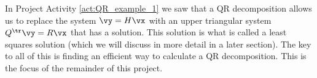 \begin{pactivity}
\begin{comment}
\solution Letting $\vx = \left[ \begin{array}{c} x_1 \\ x_2\end{array} \right]$, we have 
\[Q^{\tr} \vy =  \left[ \renewcommand{\arraystretch}{1.4} \begin{array}{rrc} 2/3&2/3&1/3\\ -\frac{\sqrt{2}}{6} &-\frac{\sqrt{2}}{6}& \frac{2\sqrt{2}}{3}\end {array} \right]   \left[ \begin{array}{c} 2 \\ 1 \\ 4\end{array} \right] =  \left[ \renewcommand{\arraystretch}{1.4} \begin{array}{c} \frac{10}{3} \\ \frac{13 \sqrt{2}}{6} \end{array} \right]\]
and
\[R \vx = \left[ \renewcommand{\arraystretch}{1.4}\begin{array}{cc} 3&3\\0&3\sqrt{2} \end{array} \right]\left[ \begin{array}{c} x_1\\x_2 \end{array} \right] = \left[\renewcommand{\arraystretch}{1.4} \begin{array}{c} 3x_1+3x_2 \\ 3\sqrt{2}x_2 \end{array} \right].\]
We are then reduced to the triangular system 
\[\left[ \renewcommand{\arraystretch}{1.4} \begin{array}{c} \frac{10}{3} \\ \frac{13 \sqrt{2}}{6} \end{array} \right] = \left[\renewcommand{\arraystretch}{1.4} \begin{array}{c} 3x_1+3x_2 \\ 3\sqrt{2}x_2 \end{array} \right].\]
This makes $x_2 = \frac{1}{\sqrt{2}}{3}\frac{13 \sqrt{2}}{6}  = \frac{13}{18}$ and $3x_1+3x_2 = \frac{10}{3}$ or $x_1 = \frac{7}{18}$. 

\end{comment} 

\ea


\end{pactivity}

In Project Activity \ref{act:QR_example_1} we saw that a QR decomposition allows us to replace the system $\vy = H\vx$ with an upper triangular system $Q^{\tr}\vy = R\vx$ that has a solution. This solution is what is called a least squares solution (which we will discuss in more detail in a later section). The key to all of this is finding an efficient way to calculate a QR decomposition. This is the focus of the remainder of this project.

